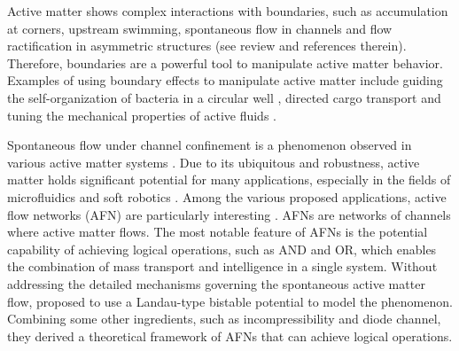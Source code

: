 \documentclass[%
10pt,
superscriptaddress,
twocolumn,
 amsmath,amssymb,
 aps,prx,
]{revtex4-2}
\begin{document}
Active matter shows complex interactions with boundaries, such as accumulation at corners, upstream swimming, spontaneous flow in channels and flow ractification in asymmetric structures (see review \cite{Bechinger2016} and references therein).
Therefore, boundaries are a powerful tool to manipulate active matter behavior.
Examples of using boundary effects to manipulate active matter include guiding the self-organization of bacteria in a circular well \cite{Lushi2014, Wioland2016}, directed cargo transport \cite{Ghosh2020} and tuning the mechanical properties of active fluids \cite{Saintillan2018, Liu2019}.

Spontaneous flow under channel confinement is a phenomenon observed in various active matter systems \cite{Lushi2014,Wioland2016,Wu2017,Duclos2017,Morin2018,Hardouin2020}.
Due to its ubiquitous and robustness, active matter holds significant potential for many applications, especially in the fields of microfluidics and soft robotics \cite{}.
Among the various proposed applications, active flow networks (AFN) are particularly interesting \cite{Woodhouse2016,Woodhouse2017}.
AFNs are networks of channels where active matter flows.
The most notable feature of AFNs is the potential capability of achieving logical operations, such as AND and OR, which enables the combination of mass transport and intelligence in a single system. 
Without addressing the detailed mechanisms governing the spontaneous active matter flow, \citet{Woodhouse2017} proposed to use a Landau-type bistable potential to model the phenomenon. 
Combining some other ingredients, such as incompressibility and diode channel, they derived a theoretical framework of AFNs that can achieve logical operations.
\end{document}
